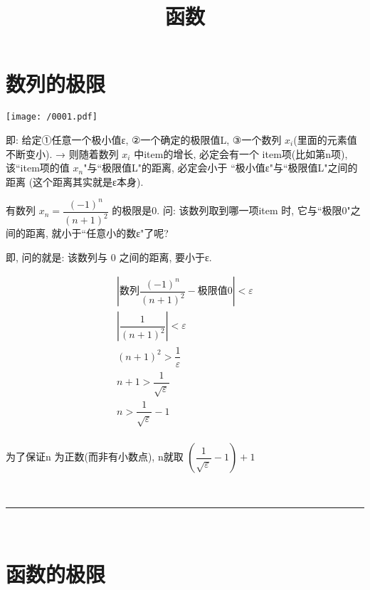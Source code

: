 \documentclass[UTF8]{ctexart}
\title{函数}
\begin{document}
	\tableofcontents %
	\maketitle  %

\part{数列的极限}

\texttt{[image: /0001.pdf]}

即: 给定①任意一个极小值ε, ②一个确定的极限值L, ③一个数列 $ x_i $(里面的元素值不断变小). → 则随着数列 
$ x_i $ 中item的增长, 必定会有一个 item项(比如第n项), 该``item项的值 $ x_n$"与``极限值L"的距离, 必定会小于 ``极小值ε"与``极限值L"之间的距离 (这个距离其实就是ε本身). \\



\begin{tcolorbox}[title = {例},boxrule={0.1em},colframe={black!10}, colback={black!3},colbacktitle={black!10},coltitle={black}]
	有数列 $x_n=\dfrac{(-1)^n} {(n+1)^2} $  的极限是0.  问: 该数列取到哪一项item 时, 它与``极限0"之间的距离, 就小于``任意小的数ε"了呢?
	
	即, 问的就是: 该数列与 0 之间的距离, 要小于ε.
	
	
	\[
		\begin{matrix}
			\left| \text{数列}\dfrac{\left( -1 \right) ^n}{\left( n+1 \right) ^2}-\text{极限值}0 \right|<\varepsilon\\
			\left| \dfrac{1}{\left( n+1 \right) ^2} \right|<\varepsilon\\
			\left( n+1 \right) ^2>\dfrac{1}{\varepsilon}\\
			n+1>\dfrac{1}{\sqrt{\varepsilon}}\\
			n>\dfrac{1}{\sqrt{\varepsilon}}-1\\
		\end{matrix}
	\]
	
	为了保证n 为正数(而非有小数点), n就取 $\left( \dfrac{1}{\sqrt{\varepsilon}}-1 \right) +1$	
\end{tcolorbox}



~\\
\hrule
~\\


\part{函数的极限}
\end{document}
